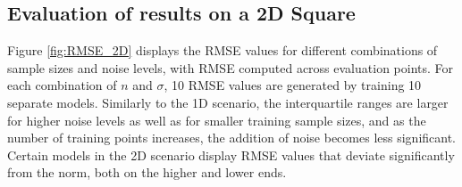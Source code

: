 \subsection{Evaluation of results on a 2D Square}
Figure \ref{fig:RMSE_2D} displays the RMSE values for different combinations of sample sizes and noise levels, with RMSE computed across evaluation points. For each combination of \(n\) and \(\sigma\), 10 RMSE values are generated by training 10 separate models. Similarly to the 1D scenario, the interquartile ranges are larger for higher noise levels as well as for smaller training sample sizes, and as the number of training points increases, the addition of noise becomes less significant. Certain models in the 2D scenario display RMSE values that deviate significantly from the norm, both on the higher and lower ends.
